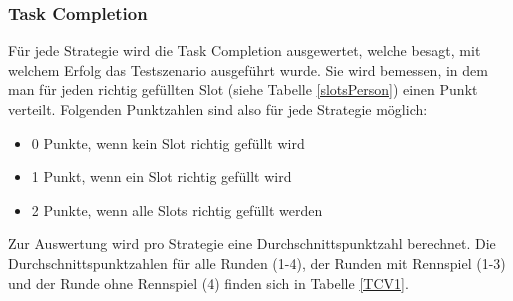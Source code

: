 \documentclass[12pt,a4paper]{scrartcl}
\begin{document}

\subsubsection{Task Completion}
\label{tcausw1}
Für jede Strategie wird die Task Completion ausgewertet, welche besagt, mit welchem Erfolg das Testszenario ausgeführt wurde. Sie wird bemessen, in dem man für jeden richtig gefüllten Slot (siehe Tabelle \ref{slotsPerson}) einen Punkt verteilt. Folgenden Punktzahlen sind also für jede Strategie möglich:
\begin{itemize}
\item 0 Punkte, wenn kein Slot richtig gefüllt wird
\item 1 Punkt, wenn ein Slot richtig gefüllt wird
\item 2 Punkte, wenn alle Slots richtig gefüllt werden
\end{itemize}
Zur Auswertung wird pro Strategie eine Durchschnittspunktzahl berechnet. Die Durchschnittspunktzahlen für alle Runden (1-4), der Runden mit Rennspiel (1-3) und der Runde ohne Rennspiel (4) finden sich in Tabelle \ref{TCV1}.
\newpage
\end{document}
